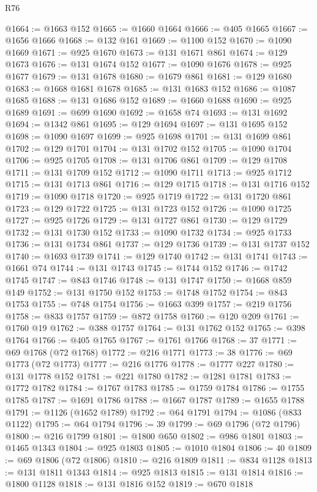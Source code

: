 \begin{lexlean}{R76}
\begin{coremodule}
@1664 := @1663 @152
@1665 := @1660 @1664
@1666 := @405 @1665
@1667 := @1656 @1666
@1668 := @132 @161
@1669 := @1100 @152
@1670 := @1090 @1669
@1671 := @925 @1670
@1673 := @131 @1671 @861
@1674 := @129 @1673
@1676 := @131 @1674 @152
@1677 := @1090 @1676
@1678 := @925 @1677
@1679 := @131 @1678
@1680 := @1679 @861
@1681 := @129 @1680
@1683 := @1668 @1681 @1678
@1685 := @131 @1683 @152
@1686 := @1087 @1685
@1688 := @131 @1686 @152
@1689 := @1660 @1688
@1690 := @925 @1689
@1691 := @699 @1690
@1692 := @1658 @74
@1693 := @131 @1692
@1694 := @1342 @861
@1695 := @129 @1694
@1697 := @131 @1695 @152
@1698 := @1090 @1697
@1699 := @925 @1698
@1701 := @131 @1699 @861
@1702 := @129 @1701
@1704 := @131 @1702 @152
@1705 := @1090 @1704
@1706 := @925 @1705
@1708 := @131 @1706 @861
@1709 := @129 @1708
@1711 := @131 @1709 @152
@1712 := @1090 @1711
@1713 := @925 @1712
@1715 := @131 @1713 @861
@1716 := @129 @1715
@1718 := @131 @1716 @152
@1719 := @1090 @1718
@1720 := @925 @1719
@1722 := @131 @1720 @861
@1723 := @129 @1722
@1725 := @131 @1723 @152
@1726 := @1090 @1725
@1727 := @925 @1726
@1729 := @131 @1727 @861
@1730 := @129 @1729
@1732 := @131 @1730 @152
@1733 := @1090 @1732
@1734 := @925 @1733
@1736 := @131 @1734 @861
@1737 := @129 @1736
@1739 := @131 @1737 @152
@1740 := @1693 @1739
@1741 := @129 @1740
@1742 := @131 @1741
@1743 := @1661 @74
@1744 := @131 @1743
@1745 := @1744 @152
@1746 := @1742 @1745
@1747 := @843 @1746
@1748 := @131 @1747
@1750 := @1668 @859 @149
@1752 := @131 @1750 @152
@1753 := @1748 @1752
@1754 := @843 @1753
@1755 := @748 @1754
@1756 := @1663 @399
@1757 := @219 @1756
@1758 := @833 @1757
@1759 := @872 @1758
@1760 := @120 @209
@1761 := @1760 @19
@1762 := @388 @1757
@1764 := @131 @1762 @152
@1765 := @398 @1764
@1766 := @405 @1765
@1767 := @1761 @1766
@1768 := 37
@1771 := @69 @1768 (@72 @1768)
@1772 := @216 @1771
@1773 := 38
@1776 := @69 @1773 (@72 @1773)
@1777 := @216 @1776
@1778 := @1777 @227
@1780 := @131 @1778 @152
@1781 := @221 @1780
@1782 := @1281 @1781
@1783 := @1772 @1782
@1784 := @1767 @1783
@1785 := @1759 @1784
@1786 := @1755 @1785
@1787 := @1691 @1786
@1788 := @1667 @1787
@1789 := @1655 @1788
@1791 := @1126 (@1652 @1789)
@1792 := @64 @1791
@1794 := @1086 (@833 @1122)
@1795 := @64 @1794
@1796 := 39
@1799 := @69 @1796 (@72 @1796)
@1800 := @216 @1799
@1801 := @1800 @650
@1802 := @986 @1801
@1803 := @1465 @1343
@1804 := @925 @1803
@1805 := @1010 @1804
@1806 := 40
@1809 := @69 @1806 (@72 @1806)
@1810 := @216 @1809
@1811 := @834 @1128
@1813 := @131 @1811 @1343
@1814 := @925 @1813
@1815 := @131 @1814
@1816 := @1800 @1128
@1818 := @131 @1816 @152
@1819 := @670 @1818

\end{coremodule}
\end{lexlean}
